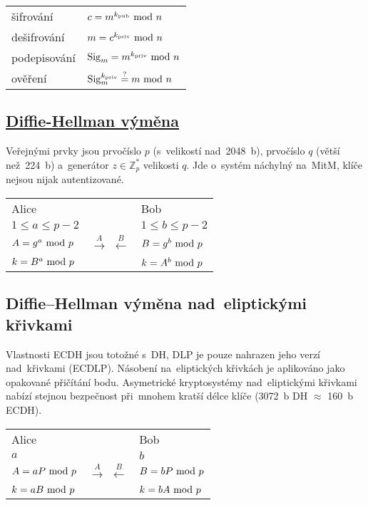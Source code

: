 \begin{table}[ht]
\begin{tabular}{ll}
šifrování & $c = m^{k_{\mathrm{pub}}} \ \mathrm{mod}\ n$ \\
dešifrování & $m = c^{k_{\mathrm{priv}}} \ \mathrm{mod}\ n$ \\
podepisování & $\mathrm{Sig}_m = m^{k_{\mathrm{priv}}} \ \mathrm{mod}\ n$ \\
ověření & $\mathrm{Sig}_m^{k_{\mathrm{priv}}} \stackrel{?}{=} m \ \mathrm{mod}\ n$ \\
\end{tabular}
\end{table}

\subsection[Diffie--Hellman výměna]{\href{https://en.wikipedia.org/wiki/Diffie-Hellman_key_exchange}{Diffie-Hellman výměna}}

Veřejnými prvky jsou prvočíslo $p$ (s~velikostí nad~2048~b), prvočíslo $q$ (větší než~224~b) a~generátor $z \in \mathbb{Z}_p^*$ velikosti $q$. Jde o~systém náchylný na~MitM, klíče nejsou nijak autentizované.

\begin{table}[ht]
\begin{tabular}{lcl}
Alice && Bob \\
$1 \le a \le p-2$ && $1 \le b \le p-2$ \\
$A = g^a \ \mathrm{mod}\ p$ & $\stackrel{A}{\rightarrow}$ $\stackrel{B}{\leftarrow}$ & $B = g^b \ \mathrm{mod}\ p$ \\
$k = B^a \ \mathrm{mod}\ p$ && $k = A^b \ \mathrm{mod}\ p$ \\
\end{tabular}
\end{table}

\subsection{Diffie--Hellman výměna nad~eliptickými křivkami}

Vlastnosti ECDH jsou totožné s~DH, DLP je pouze nahrazen jeho verzí nad~křivkami (ECDLP). Násobení na~eliptických křivkách je aplikováno jako opakované přičítání bodu. Asymetrické kryptosystémy nad~eliptickými křivkami nabízí stejnou bezpečnost při~mnohem kratší délce klíče (3072~b DH $\approx$ 160~b ECDH).

\begin{table}[ht]
\begin{tabular}{lcl}
Alice && Bob \\
$a$ && $b$ \\
$A = aP \ \mathrm{mod}\ p$ & $\stackrel{A}{\rightarrow}$ $\stackrel{B}{\leftarrow}$ & $B = bP \ \mathrm{mod}\ p$ \\
$k = aB \ \mathrm{mod}\ p$ && $k = bA \ \mathrm{mod}\ p$ \\
\end{tabular}
\end{table}

